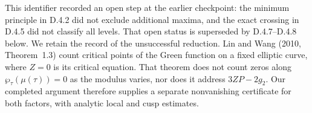 \begin{remark}\label{push:src:D.4.6}
This identifier recorded an open step at the earlier checkpoint:
the minimum principle in D.4.2 did not exclude additional maxima,
and the exact crossing in D.4.5 did not classify all levels. That
open status is superseded by D.4.7--D.4.8 below. We retain the
record of the unsuccessful reduction. Lin and Wang (2010,
Theorem~1.3) count critical points of the Green function on a fixed
elliptic curve, where \(Z=0\) is its critical equation. That theorem
does not count zeros along \(\wp_\tau(\mu(\tau))=0\) as the modulus
varies, nor does it address \(3ZP-2g_2\). Our completed argument
therefore supplies a separate nonvanishing certificate for both
factors, with analytic local and cusp estimates.
\end{remark}

